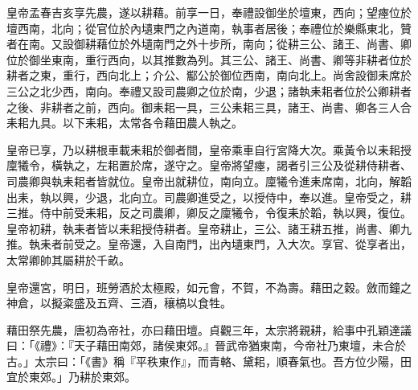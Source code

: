 \begin{pinyinscope}
 皇帝孟春吉亥享先農，遂以耕藉。前享一日，奉禮設御坐於壇東，西向；望瘞位於壇西南，北向；從官位於內壝東門之內道南，執事者居後；奉禮位於樂縣東北，贊者在南。又設御耕藉位於外壝南門之外十步所，南向；從耕三公、諸王、尚書、卿位於御坐東南，重行西向，以其推數為列。其三公、諸王、尚書、卿等非耕者位於耕者之東，重行，西向北上；介公、酅公於御位西南，南向北上。尚舍設御耒席於三公之北少西，南向。奉禮又設司農卿之位於南，少退；諸執耒耜者位於公卿耕者之後、非耕者之前，西向。御耒耜一具，三公耒耜三具，諸王、尚書、卿各三人合耒耜九具。以下耒耜，太常各令藉田農人執之。



 皇帝已享，乃以耕根車載耒耜於御者間，皇帝乘車自行宮降大次。乘黃令以耒耜授廩犧令，橫執之，左耜置於席，遂守之。皇帝將望瘞，謁者引三公及從耕侍耕者、司農卿與執耒耜者皆就位。皇帝出就耕位，南向立。廩犧令進耒席南，北向，解韜出耒，執以興，少退，北向立。司農卿進受之，以授侍中，奉以進。皇帝受之，耕三推。侍中前受耒耜，反之司農卿，卿反之廩犧令，令復耒於韜，執以興，復位。皇帝初耕，執耒者皆以耒耜授侍耕者。皇帝耕止，三公、諸王耕五推，尚書、卿九推。執耒者前受之。皇帝還，入自南門，出內壝東門，入大次。享官、從享者出，太常卿帥其屬耕於千畝。



 皇帝還宮，明日，班勞酒於太極殿，如元會，不賀，不為壽。藉田之穀。斂而鐘之神倉，以擬粢盛及五齊、三酒，穰槁以食牲。



 藉田祭先農，唐初為帝社，亦曰藉田壇。貞觀三年，太宗將親耕，給事中孔穎達議曰：「《禮》：『天子藉田南郊，諸侯東郊。』晉武帝猶東南，今帝社乃東壇，未合於古。」太宗曰：「《書》稱『平秩東作』，而青輅、黛耜，順春氣也。吾方位少陽，田宜於東郊。」乃耕於東郊。




\end{pinyinscope}
